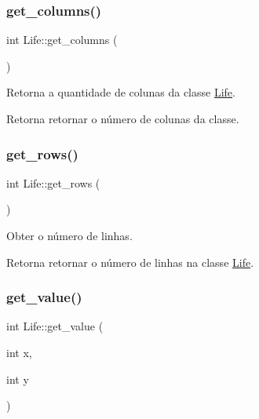 \subsubsection{\texorpdfstring{get\+\_\+columns()}{get\_columns()}}
{\footnotesize\ttfamily int Life\+::get\+\_\+columns (\begin{DoxyParamCaption}{ }\end{DoxyParamCaption})}

Retorna a quantidade de colunas da classe \hyperlink{classLife}{Life}. \begin{DoxyReturn}{Retorna}
retornar o número de colunas da classe. 
\end{DoxyReturn}
\mbox{\label{classLife_ae4a3608385b8435f55102c89363d6e26}} 
\subsubsection{\texorpdfstring{get\+\_\+rows()}{get\_rows()}}
{\footnotesize\ttfamily int Life\+::get\+\_\+rows (\begin{DoxyParamCaption}{ }\end{DoxyParamCaption})}

Obter o número de linhas. \begin{DoxyReturn}{Retorna}
retornar o número de linhas na classe \hyperlink{classLife}{Life}. 
\end{DoxyReturn}
\mbox{\label{classLife_a84991971ca97509cc769ad527f010585}} 
\subsubsection{\texorpdfstring{get\+\_\+value()}{get\_value()}}
{\footnotesize\ttfamily int Life\+::get\+\_\+value (\begin{DoxyParamCaption}\item[{int}]{x,  }\item[{int}]{y }\end{DoxyParamCaption})}

